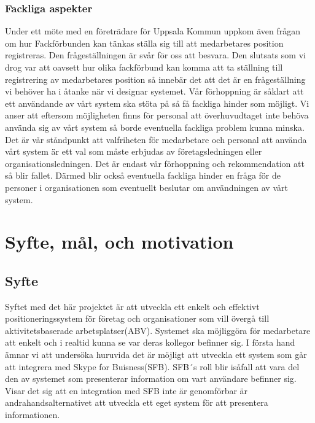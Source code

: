 \documentclass[swedish, a4paper,12pt]{article}
\begin{document}
\subsubsection{Fackliga aspekter}
Under ett möte med en företrädare för Uppsala Kommun uppkom även frågan om hur Fackförbunden kan tänkas ställa sig till att medarbetares position registreras.
Den frågeställningen är svår för oss att besvara. Den slutsats som vi drog var att oavsett hur olika fackförbund kan komma att ta ställning till registrering av medarbetares position så innebär det att det är en frågeställning vi behöver ha i åtanke när vi designar systemet. Vår förhoppning är såklart att ett användande av vårt system ska stöta på så få fackliga hinder som möjligt. Vi anser att eftersom möjligheten finns för personal att överhuvudtaget inte behöva använda sig av vårt system så borde eventuella fackliga problem kunna minska. Det är vår ståndpunkt att valfriheten för medarbetare och personal att använda vårt system är ett val som måste erbjudas av företagsledningen eller organisationsledningen. Det är endast vår förhoppning och rekommendation att så blir fallet. Därmed blir också eventuella fackliga hinder en fråga för de personer i organisationen som eventuellt beslutar om användningen av vårt system.





\newpage
\section{Syfte, mål, och motivation}
\subsection{Syfte}
Syftet med det här projektet är att utveckla ett enkelt och effektivt positioneringssystem för företag och organisationer som vill övergå till aktivitetsbaserade arbetsplatser(ABV). Systemet ska möjliggöra för medarbetare att enkelt och i realtid kunna se var deras kollegor befinner sig. I första hand ämnar vi att undersöka huruvida det är möjligt att utveckla ett system som går att integrera med Skype for Buisness(SFB). SFB´s roll blir isåfall att vara del den av systemet som presenterar information om vart användare befinner sig. Visar det sig att en integration med SFB inte är genomförbar är andrahandsalternativet att utveckla ett eget system för att presentera informationen.
\end{document}
